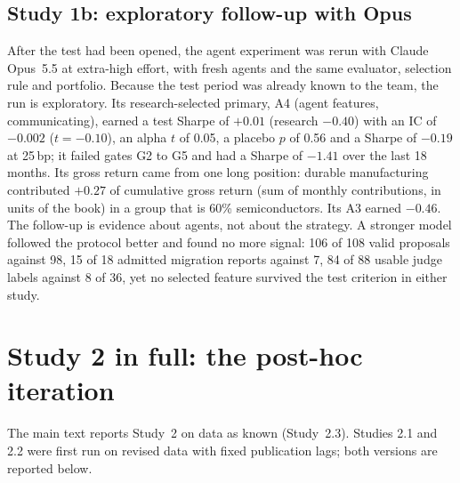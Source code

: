 \documentclass[11pt,letterpaper]{article}
\begin{document}
\subsection*{Study 1b: exploratory follow-up with Opus}\label{app:opus}
After the test had been opened, the agent experiment was rerun with Claude
Opus~5.5 at extra-high effort, with fresh agents and the same evaluator,
selection rule and portfolio. Because the test period was already known to the
team, the run is exploratory. Its research-selected primary, A4 (agent
features, communicating), earned a test Sharpe of $+0.01$ (research $-0.40$)
with an IC of $-0.002$ ($t=-0.10$), an alpha $t$ of 0.05, a placebo $p$ of 0.56
and a Sharpe of $-0.19$ at 25\,bp; it failed gates G2 to G5 and had a Sharpe of
$-1.41$ over the last 18 months. %
Its gross return came from one long position: durable manufacturing contributed
$+0.27$ of cumulative gross return (sum of monthly contributions, in units of
the book) in a group that is 60\% semiconductors. %
Its A3 earned $-0.46$. %
The follow-up is evidence about agents, not about the strategy. A stronger model
followed the protocol better and found no more signal: 106 of 108 valid
proposals against 98, 15 of 18 admitted migration reports against 7, 84 of 88
usable judge labels against 8 of 36, %
yet no selected feature survived the test criterion in either study. %

\section{Study 2 in full: the post-hoc iteration}\label{app:study2}
The main text reports Study~2 on data as known (Study~2.3). Studies 2.1 and 2.2
were first run on revised data with fixed publication lags; both versions are
reported below.
\end{document}
